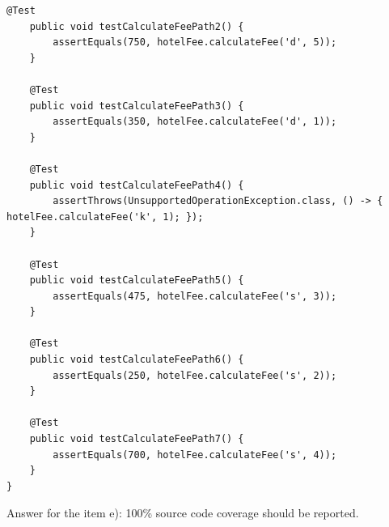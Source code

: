 \begin{exercise}
\begin{lstlisting}[caption={All the tests thare defined by the independent paths of the HotelFee program.}]
	@Test
	public void testCalculateFeePath2() {
		assertEquals(750, hotelFee.calculateFee('d', 5));
	}
	
	@Test
	public void testCalculateFeePath3() {
		assertEquals(350, hotelFee.calculateFee('d', 1));
	}
	
	@Test
	public void testCalculateFeePath4() {
		assertThrows(UnsupportedOperationException.class, () -> { hotelFee.calculateFee('k', 1); });
	}
	
	@Test
	public void testCalculateFeePath5() {
		assertEquals(475, hotelFee.calculateFee('s', 3));
	}
	
	@Test
	public void testCalculateFeePath6() {
		assertEquals(250, hotelFee.calculateFee('s', 2));
	}
	
	@Test
	public void testCalculateFeePath7() {
		assertEquals(700, hotelFee.calculateFee('s', 4));
	}
}
    \end{lstlisting}
    
    Answer for the item e): 100\% source code coverage should be reported.
\end{exercise}

